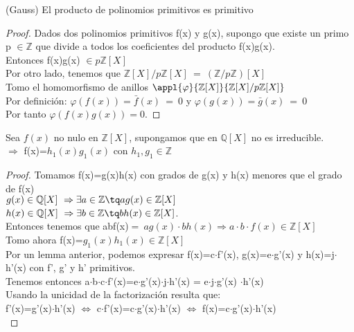 \documentclass[nochap]{apuntes}
\begin{document}
\obs(Gauss) El producto de polinomios primitivos es primitivo
\begin{proof}
 Dados dos polinomios primitivos f(x) y g(x), supongo que existe un primo p $\in \mathbb{Z}$  que divide a todos los coeficientes del producto
 f(x)g(x).\\
 Entonces f(x)g(x) $\in p\mathbb{Z}[X]$\\
 Por otro lado, tenemos que $\mathbb{Z}[X]/p\mathbb{Z}[X] \ = \ (\mathbb{Z}/p\mathbb{Z})[X]$\\
 Tomo el homomorfismo de anillos $\appl{\varphi}{\mathbb{Z}[X]}{\mathbb{Z}[X]/p\mathbb{Z}[X]}$\\
 Por definición: $\varphi(f(x))=\bar{f}(x) \ = \ 0$  y $\varphi(g(x))=\bar{g}(x) \ = \ 0$\\
 Por tanto $\varphi(f(x)g(x))=0$.
\end{proof}

\begin{lemma}
 Sea $f(x)$ no nulo en $\mathbb{Z}[X]$, supongamos que en $\mathbb{Q}[X]$  no es irreducible.\\
 $\Rightarrow$  f(x)=$h_1(x)g_1(x)$  con $h_1, g_1 \in \mathbb{Z}$
\end{lemma}

\begin{proof}
 Tomamos f(x)=g(x)h(x) con grados de g(x) y h(x) menores que el grado de f(x)\\

 $g(x)\in\mathbb{Q}[X] \ \Rightarrow \exists a \in \mathbb{Z} \tq ag(x) \in \mathbb{Z}[X]$\\
 $h(x)\in\mathbb{Q}[X] \ \Rightarrow \exists b \in \mathbb{Z} \tq bh(x) \in \mathbb{Z}[X]$.\\
 Entonces tenemos que abf(x)$= \ ag(x)\cdot bh(x) \Rightarrow a\cdot b\cdot f(x) \in \mathbb{Z}[X]$\\

 Tomo ahora f(x)=$g_1(x)h_1(x) \in \mathbb{Z}[X]$\\
 Por un lemma anterior, podemos expresar f(x)=c$\cdot$f'(x), g(x)=e$\cdot$g'(x) y h(x)=j$\cdot$h'(x) con f', g' y h' primitivos.\\

 Tenemos entonces a$\cdot$b$\cdot$c$\cdot$f'(x)=e$\cdot$g'(x)$\cdot$j$\cdot$h'(x) =  e$\cdot$j$\cdot$g'(x) $\cdot$h'(x)\\
 Usando la unicidad de la factorización resulta que:\\
 f'(x)=g'(x)$\cdot$h'(x) $\Leftrightarrow$  c$\cdot$f'(x)=c$\cdot$g'(x)$\cdot$h'(x) $\Leftrightarrow$ f(x)=c$\cdot$g'(x)$\cdot$h'(x)\\
\end{proof}
\end{document}

